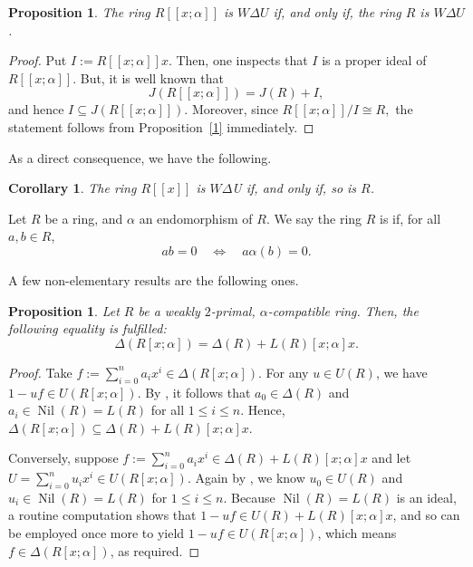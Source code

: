 \documentclass[12pt]{amsart}
\newtheorem{proposition}[theorem]{Proposition}
\newtheorem{corollary}[theorem]{Corollary}
\theoremstyle{definition}
\begin{document}
\begin{proposition}\label{3.9}
The ring $R[[x;\alpha]]$ is $W\Delta U$ if, and only if, the ring $R$ is $W\Delta U$.
\end{proposition}

\begin{proof}
Put $I := R[[x;\alpha]]x$. Then, one inspects that $I$ is a proper ideal of $R[[x;\alpha]]$. But, it is well known that
\[
	J(R[[x;\alpha]]) = J(R) + I,
\]
and hence $I \subseteq J(R[[x;\alpha]])$. Moreover, since
	$
	R[[x;\alpha]]/I \cong R,
	$
the statement follows from Proposition~\ref{1} immediately.
\end{proof}

As a direct consequence, we have the following.

\begin{corollary}
The ring $R[[x]]$ is $W\Delta$U if, and only if, so is $R$.
\end{corollary}

Let \(R\) be a ring, and \(\alpha\) an endomorphism of \(R\). We say the ring \(R\) is  if, for all \(a, b \in R\),
\[
ab = 0 \quad \Longleftrightarrow \quad a\alpha(b) = 0.
\]

\medskip

A few non-elementary results are the following ones.

\begin{proposition}\label{2.10}
Let \(R\) be a weakly \(2\)-primal, \(\alpha\)-compatible ring. Then, the following equality is fulfilled:
\[
	\Delta(R[x; \alpha]) = \Delta(R) + L(R)[x; \alpha]x.
\]
\end{proposition}

\begin{proof}
Take \(f := \sum_{i=0}^n a_i x^i \in \Delta(R[x; \alpha])\). For any \(u \in U(R)\), we have \(1 - uf \in U(R[x; \alpha])\). By \cite[Corollary~2.14]{15}, it follows that \(a_0 \in \Delta(R)\) and \(a_i \in \operatorname{Nil}(R) = L(R)\) for all \(1 \le i \le n\). Hence, \(\Delta(R[x; \alpha]) \subseteq \Delta(R) + L(R)[x; \alpha]x\).
	
Conversely, suppose \(f := \sum_{i=0}^n a_i x^i \in \Delta(R) + L(R)[x; \alpha]x\) and let \(U = \sum_{i=0}^n u_i x^i \in U(R[x; \alpha])\). Again by \cite[Corollary~2.14]{15}, we know \(u_0 \in U(R)\) and \(u_i \in \operatorname{Nil}(R) = L(R)\) for \(1 \le i \le n\). Because \(\operatorname{Nil}(R) = L(R)\) is an ideal, a routine computation shows that \(1 - uf \in U(R) + L(R)[x; \alpha]x\), and so \cite[Corollary~2.14]{15} can be employed once more to yield \(1 - uf \in U(R[x; \alpha])\), which means \(f \in \Delta(R[x; \alpha])\), as required.
\end{proof}
\end{document}
